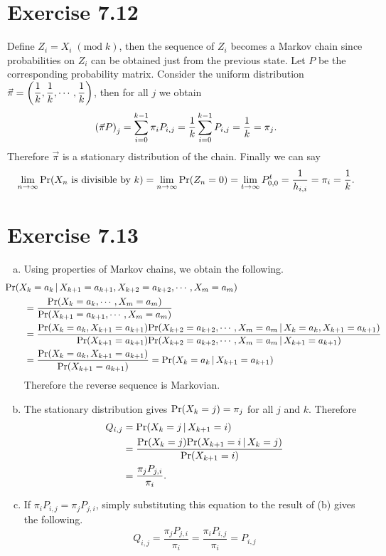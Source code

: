 \documentclass{article}
\begin{document}
\section*{Exercise 7.12}
Define $Z_i = X_i \;(\mathrm{mod}\; k)$, then the sequence of $Z_i$ becomes a Markov chain since probabilities on $Z_i$ can be obtained just from the previous state.
Let $P$ be the corresponding probability matrix. 
Consider the uniform distribution $\vec{\pi} = \qty(\dfrac{1}{k}, \dfrac{1}{k}, \cdots, \dfrac{1}{k})$, then for all $j$ we obtain
$$\qty(\vec{\pi}P)_{j} = \sum_{i=0}^{k-1}{\pi}_iP_{i, j} = \frac{1}{k}\sum_{i=0}^{k-1}P_{i, j} = \frac{1}{k} = {\pi}_{j}.$$
Therefore $\vec{\pi}$ is a stationary distribution of the chain.
Finally we can say
$$\lim_{n \to \infty}\mathrm{Pr}\qty(X_n \text{ is divisible by } k) = \lim_{n \to \infty}\mathrm{Pr}\qty(Z_n = 0) = \lim_{t \to \infty}P_{0, 0}^{t} = \frac{1}{h_{i, i}} = \pi_i = \frac{1}{k}.$$

\section*{Exercise 7.13}
\begin{enumerate}[(a)]
    \item Using properties of Markov chains, we obtain the following.
    \begin{align*}
        &\hspace{-7mm} \mathrm{Pr}\qty(X_k = a_k \,|\, X_{k+1} = a_{k+1}, X_{k+2} = a_{k+2}, \cdots, X_m = a_m) \\
        &= \frac{\mathrm{Pr}\qty(X_k = a_k, \cdots, X_m = a_m)}{\mathrm{Pr}\qty(X_{k+1} = a_{k+1}, \cdots, X_m = a_m)} \\
        &= \frac{\mathrm{Pr}\qty(X_k = a_k, X_{k+1} = a_{k+1})\mathrm{Pr}\qty(X_{k+2} = a_{k+2}, \cdots, X_m = a_m \,|\, X_k = a_k, X_{k+1} = a_{k+1})}{\mathrm{Pr}\qty(X_{k+1} = a_{k+1})\mathrm{Pr}\qty(X_{k+2} = a_{k+2}, \cdots, X_m = a_m \,|\, X_{k+1} = a_{k+1})} \\
        &= \frac{\mathrm{Pr}\qty(X_k = a_k, X_{k+1} = a_{k+1})}{\mathrm{Pr}\qty(X_{k+1} = a_{k+1})} = \mathrm{Pr}\qty(X_k = a_k \,|\, X_{k+1} = a_{k+1})
    \end{align*}
    Therefore the reverse sequence is Markovian.
    \item The stationary distribution gives $\mathrm{Pr}\qty(X_k = j) = \pi_j$ for all $j$ and $k$. Therefore
    \begin{align*}
        Q_{i, j} &= \mathrm{Pr}\qty(X_k = j \,|\, X_{k+1} = i) \\
        &= \frac{\mathrm{Pr}\qty(X_k = j)\mathrm{Pr}\qty(X_{k+1} = i \,|\, X_k = j)}{\mathrm{Pr}\qty(X_{k+1} = i)} \\
        &= \frac{\pi_jP_{j, i}}{\pi_i}.
    \end{align*}
    \item If $\pi_iP_{i, j} = \pi_jP_{j, i}$, simply substituting this equation to the result of (b) gives the following.
    $$Q_{i, j} = \frac{\pi_jP_{j, i}}{\pi_i} = \frac{\pi_iP_{i, j}}{\pi_i} = P_{i, j}$$
\end{enumerate}
\end{document}
